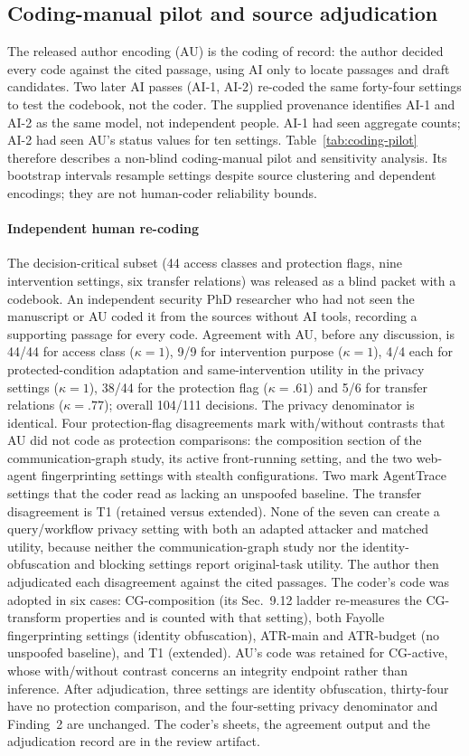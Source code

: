 \subsection{Coding-manual pilot and source adjudication}\label{supp:coding-pilot}
The released author encoding (AU) is the coding of record: the author decided every code against the cited passage, using AI only to locate passages and draft candidates. Two later AI passes (AI-1, AI-2) re-coded the same forty-four settings to test the codebook, not the coder. The supplied provenance identifies AI-1 and AI-2 as the same model, not independent people. AI-1 had seen aggregate counts; AI-2 had seen AU's status values for ten settings. Table~\ref{tab:coding-pilot} therefore describes a non-blind coding-manual pilot and sensitivity analysis. Its bootstrap intervals resample settings despite source clustering and dependent encodings; they are not human-coder reliability bounds. \paragraph{Independent human re-coding} The decision-critical subset (44 access classes and protection flags, nine intervention settings, six transfer relations) was released as a blind packet with a codebook. An independent security PhD researcher who had not seen the manuscript or AU coded it from the sources without AI tools, recording a supporting passage for every code. Agreement with AU, before any discussion, is 44/44 for access class ($\kappa=1$), 9/9 for intervention purpose ($\kappa=1$), 4/4 each for protected-condition adaptation and same-intervention utility in the privacy settings ($\kappa=1$), 38/44 for the protection flag ($\kappa=.61$) and 5/6 for transfer relations ($\kappa=.77$); overall 104/111 decisions. The privacy denominator is identical. Four protection-flag disagreements mark with/without contrasts that AU did not code as protection comparisons: the composition section of the communication-graph study, its active front-running setting, and the two web-agent fingerprinting settings with stealth configurations. Two mark AgentTrace settings that the coder read as lacking an unspoofed baseline. The transfer disagreement is T1 (retained versus extended). None of the seven can create a query/workflow privacy setting with both an adapted attacker and matched utility, because neither the communication-graph study nor the identity-obfuscation and blocking settings report original-task utility. The author then adjudicated each disagreement against the cited passages. The coder's code was adopted in six cases: CG-composition (its Sec.~9.12 ladder re-measures the CG-transform properties and is counted with that setting), both Fayolle fingerprinting settings (identity obfuscation), ATR-main and ATR-budget (no unspoofed baseline), and T1 (extended). AU's code was retained for CG-active, whose with/without contrast concerns an integrity endpoint rather than inference. After adjudication, three settings are identity obfuscation, thirty-four have no protection comparison, and the four-setting privacy denominator and Finding~2 are unchanged. The coder's sheets, the agreement output and the adjudication record are in the review artifact.

